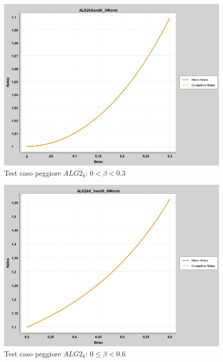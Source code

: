 \documentclass[12pt]{article}
\begin{document}
\begin{figure}[H]
\caption{Test caso peggiore $ALG2_{k}$: $0 < \beta < 0.3$}
\centering
\includegraphics[scale=0.4]{worst/ALG2k0and0_3Worst.png}
\end{figure}
\begin{figure}[H]
\caption{Test caso peggiore $ALG2_{k}$: $0 \leq \beta < 0.6$}
\centering
\includegraphics[scale=0.4]{worst/ALG2k0_3and0_6Worst.png}
\end{figure}
\end{document}
